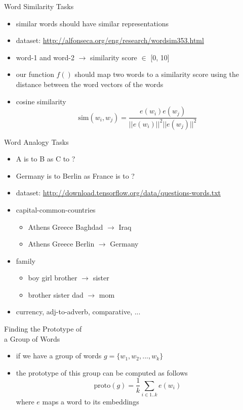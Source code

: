 \begin{frame}{Word Similarity Tasks}
     \begin{itemize}
         \item<1-> similar words should have similar representations
         \item<1-> dataset: \url{http://alfonseca.org/eng/research/wordsim353.html}
         \item<2->  word-1 and word-2 $\rightarrow$ similarity score $\in$ [0, 10]
         \item<3-> our function $f()$ should map two words to a similarity score using the distance between the word vectors of the words 
         \item<4-> cosine similarity
         \begin{equation*}
             \text{sim}(w_i,w_j) = \frac{e(w_i) e(w_j)}{||e(w_i)||^2 ||e(w_j)||^2}
         \end{equation*} 
     \end{itemize}
 \end{frame}
\begin{frame}{Word Analogy Tasks}
     \begin{itemize}
         \item<1-> A is to B as C to ?
         \item<2-> Germany is to Berlin as France is to ?
         \item<2-> dataset:
         \url{http://download.tensorflow.org/data/questions-words.txt}
         \item<3-> capital-common-countries
         \begin{itemize}
             \item<3-> Athens Greece Baghdad  $\rightarrow$ Iraq
             \item<3-> Athens Greece Berlin  $\rightarrow$ Germany
         \end{itemize}
         \item<4-> family
        \begin{itemize}
            \item<4-> boy girl brother $\rightarrow$ sister
            \item<4-> brother sister dad $\rightarrow$ mom
        \end{itemize}
     \item<5-> currency, adj-to-adverb, comparative, ...
     \end{itemize}
 \end{frame}
\begin{frame}{Finding the Prototype of  \\ a Group of Words}
     \begin{itemize}
        \item<1-> if we have a group of words $g = \{ w_1, w_2, ..., w_k \}$
        \item<2-> the prototype of this group can be computed as follows
            \begin{equation*}
                \text{proto}(g) = \frac{1}{k} \sum_{i \in 1..k} e(w_i)
            \end{equation*}
            where $e$ maps a word to its  embeddings
     \end{itemize}
 \end{frame}
